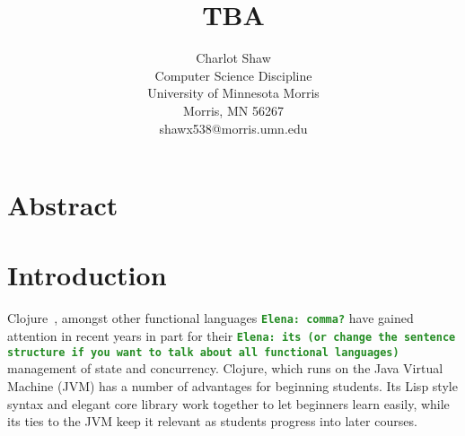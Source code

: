 \documentclass[12pt]{article}
\newcommand{\comment}[1]{{\bf \tt  {#1}}}
\newcommand{\emcomment}[1]{\textcolor{ForestGreen}{\comment{Elena: {#1}}}}
\begin{document}
\pagestyle{plain}
%

\title{TBA}
%
%

\author{
Charlot Shaw \\
Computer Science Discipline \\
University of Minnesota Morris\\
Morris, MN 56267\\
shawx538@morris.umn.edu
}
\maketitle
\thispagestyle{empty}

\section*{\centering Abstract}


\newpage
\setcounter{page}{1}

\section{Introduction}
Clojure~\cite{Hickey:2008}, amongst other functional languages \emcomment{comma?} have gained attention in recent years
in part for their \emcomment{its (or change the sentence structure if you want to talk about all functional languages)} management of state and concurrency.
Clojure, which runs on the Java Virtual Machine (JVM) has a number of advantages for beginning students.
Its Lisp style syntax and elegant core library
 work together to let beginners learn easily, while
its ties to the JVM keep it relevant as students progress into later courses.
\end{document}
